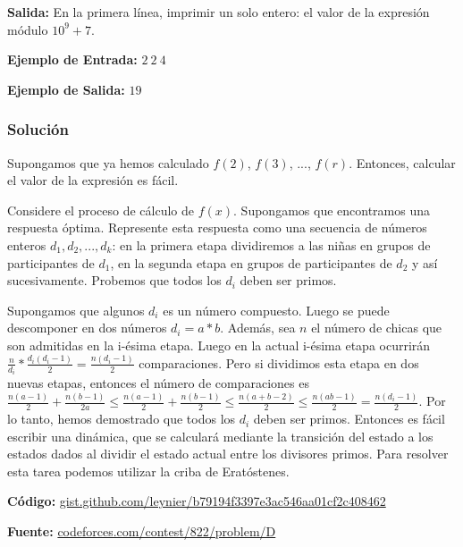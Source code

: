 \documentclass[12pt]{article}
\newcommand{\nl}{\vspace{0.3cm}}
\begin{document}
\nl

\textbf{Salida:} En la primera línea, imprimir un solo entero: el valor de la expresión módulo $10^9 + 7$.

\nl

\textbf{Ejemplo de Entrada:} $2\ 2\ 4$

\nl

\textbf{Ejemplo de Salida:} $19$

\subsubsection{Solución}

Supongamos que ya hemos calculado $f(2)$, $f(3)$, $...$, $f(r)$. Entonces, calcular el valor de la expresión es fácil.

\nl

Considere el proceso de cálculo de $f(x)$. Supongamos que encontramos una respuesta óptima. Represente esta respuesta como una secuencia de números enteros $d_1, d_2, ..., d_k$: en la primera etapa dividiremos a las niñas en grupos de participantes de $d_1$, en la segunda etapa en grupos de participantes de $d_2$ y así sucesivamente. Probemos que todos los $d_i$ deben ser primos.

\nl

Supongamos que algunos $d_i$ es un número compuesto. Luego se puede descomponer en dos números $d_i = a * b$. Además, sea $n$ el número de chicas que son admitidas en la i-ésima etapa. Luego en la actual i-ésima etapa ocurrirán $ \frac{n}{d_i} * \frac{d_i(d_i - 1)}{2} =  \frac{n(d_i - 1)}{2}$ comparaciones. Pero si dividimos esta etapa en dos nuevas etapas, entonces el número de comparaciones es $ \frac{n(a-1)}{2} + \frac{n(b - 1)}{2a} \leqslant \frac{n(a-1)}{2} + \frac{n(b-1)}{2} \leqslant \frac{n(a+b-2)}{2} \leqslant \frac{n(ab - 1)}{2} = \frac{n(d_i - 1)}{2}$. Por lo tanto, hemos demostrado que todos los $d_i$ deben ser primos. Entonces es fácil escribir una dinámica, que se calculará mediante la transición del estado a los estados dados al dividir el estado actual entre los divisores primos. Para resolver esta tarea podemos utilizar la criba de Eratóstenes.

\nl

\textbf{Código:} \href{https://gist.github.com/leynier/b79194f3397e3ac546aa01cf2c408462}{gist.github.com/leynier/b79194f3397e3ac546aa01cf2c408462}

\nl

\textbf{Fuente:} \href{https://codeforces.com/contest/822/problem/D}{codeforces.com/contest/822/problem/D}

\nocite{*}


\end{document}
